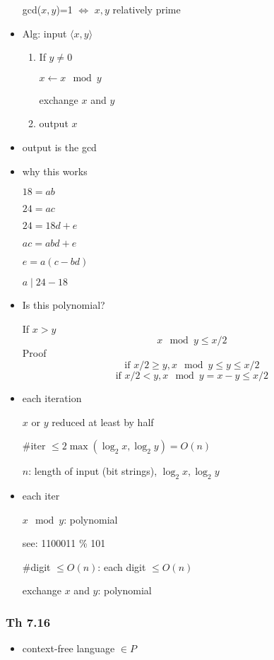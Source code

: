 \begin{frame}[allowframebreaks]
\begin{itemize}
gcd($x,y$)=1
$\Leftrightarrow$ $x,y$ relatively prime

\item Alg: input $\langle  x,y\rangle $
  \begin{enumerate}
  \item If $y \neq 0$

$x \leftarrow x \mod y$

exchange $x$ and $y$
\item output $x$
  \end{enumerate}
\item output is the gcd
\item why this works

$18=ab$

$24=ac$

$24 = 18d + e$

$ac=abd + e$

$e = a (c-bd)$

$a \mid  24-18$
\item 

Is this polynomial?

If $x > y$
\begin{equation*}
  x \mod y \leq x/2
\end{equation*}
Proof
\begin{equation*}
  \mbox{if } x/2 \geq y, x \mod y \leq y \leq x/2
\end{equation*}
\begin{equation*}
  \mbox{if } x/2 < y, x \mod y = x-y \leq x/2
\end{equation*}
\item each iteration

$x$ or $y$ reduced at least by half 

\#iter $\leq 2\max(\log_2 x, \log_2 y)= O(n)$

$n$: length of input (bit strings), $\log_2 x, \log_2 y$
\item each iter

$x \mod y$:  polynomial

see: 1100011 \% 101

\#digit $\leq O(n)$: each digit $\leq O(n)$

exchange $x$ and $y$: polynomial

\end{itemize}\end{frame} \begin{frame}[allowframebreaks] \frametitle{Th 7.16}
  \begin{itemize}
\item context-free language $\in P$


\end{itemize}
\end{frame}
